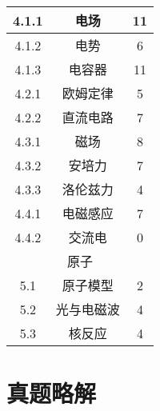 \begin{center}
\begin{minipage}{0.48\textwidth}
\begin{tabular}{c|c|c}
            4.1.1&电场&11\\\hline
            4.1.2&电势&6\\\hline
            4.1.3&电容器&11\\\hline
            4.2.1&欧姆定律&5\\\hline
            4.2.2&直流电路&7\\\hline
            4.3.1&磁场&8\\\hline
            4.3.2&安培力&7\\\hline
            4.3.3&洛伦兹力&4\\\hline
            4.4.1&电磁感应&7\\\hline
            4.4.2&交流电&0\\\hline
            \multicolumn{3}{c}{原子}\\\hline
            5.1&原子模型&2\\\hline
            5.2&光与电磁波&4\\\hline
            5.3&核反应&4\\\hline
        \end{tabular}
    \end{minipage}
\end{center}

\chapter{真题略解}






